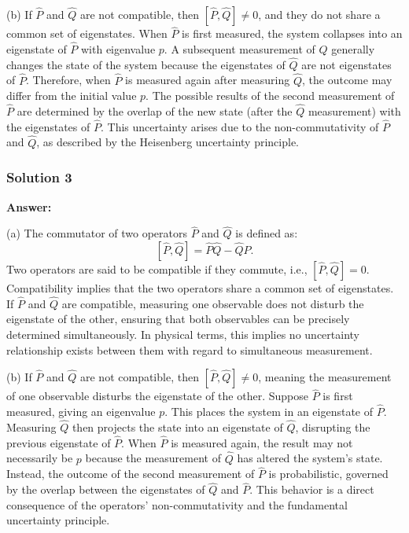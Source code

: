 \documentclass{article}
\begin{document}
(b) If $\hat{P}$ and $\hat{Q}$ are not compatible, then $[\hat{P}, \hat{Q}] \neq 0$, and they do not share a common set of eigenstates. When $\hat{P}$ is first measured, the system collapses into an eigenstate of $\hat{P}$ with eigenvalue $p$. A subsequent measurement of $\hat{Q}$ generally changes the state of the system because the eigenstates of $\hat{Q}$ are not eigenstates of $\hat{P}$. Therefore, when $\hat{P}$ is measured again after measuring $\hat{Q}$, the outcome may differ from the initial value $p$. The possible results of the second measurement of $\hat{P}$ are determined by the overlap of the new state (after the $\hat{Q}$ measurement) with the eigenstates of $\hat{P}$. This uncertainty arises due to the non-commutativity of $\hat{P}$ and $\hat{Q}$, as described by the Heisenberg uncertainty principle.

\subsubsection{Solution 3}

\textbf{Answer:}

(a) The commutator of two operators $\hat{P}$ and $\hat{Q}$ is defined as:
\[
[\hat{P}, \hat{Q}] = \hat{P}\hat{Q} - \hat{Q}\hat{P}.
\]
Two operators are said to be compatible if they commute, i.e., $[\hat{P}, \hat{Q}] = 0$. Compatibility implies that the two operators share a common set of eigenstates. If $\hat{P}$ and $\hat{Q}$ are compatible, measuring one observable does not disturb the eigenstate of the other, ensuring that both observables can be precisely determined simultaneously. In physical terms, this implies no uncertainty relationship exists between them with regard to simultaneous measurement.

(b) If $\hat{P}$ and $\hat{Q}$ are not compatible, then $[\hat{P}, \hat{Q}] \neq 0$, meaning the measurement of one observable disturbs the eigenstate of the other. Suppose $\hat{P}$ is first measured, giving an eigenvalue $p$. This places the system in an eigenstate of $\hat{P}$. Measuring $\hat{Q}$ then projects the state into an eigenstate of $\hat{Q}$, disrupting the previous eigenstate of $\hat{P}$. When $\hat{P}$ is measured again, the result may not necessarily be $p$ because the measurement of $\hat{Q}$ has altered the system's state. Instead, the outcome of the second measurement of $\hat{P}$ is probabilistic, governed by the overlap between the eigenstates of $\hat{Q}$ and $\hat{P}$. This behavior is a direct consequence of the operators' non-commutativity and the fundamental uncertainty principle.
\end{document}
